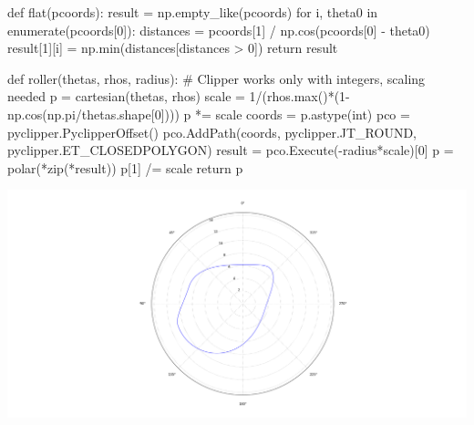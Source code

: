 \documentclass[a4paper,10pt,twoside]{article}
\begin{document}
    \begin{pycode}
    def flat(pcoords):
        result = np.empty_like(pcoords)
        for i, theta0 in enumerate(pcoords[0]):
            distances = pcoords[1] / np.cos(pcoords[0] - theta0)
            result[1][i] = np.min(distances[distances > 0])
        return result
    
    def roller(thetas, rhos, radius):
        # Clipper works only with integers, scaling needed
        p = cartesian(thetas, rhos)
        scale = 1/(rhos.max()*(1-np.cos(np.pi/thetas.shape[0])))
        p *= scale
        coords = p.astype(int)
        pco = pyclipper.PyclipperOffset()
        pco.AddPath(coords, pyclipper.JT_ROUND, pyclipper.ET_CLOSEDPOLYGON)
        result = pco.Execute(-radius*scale)[0]
        p = polar(*zip(*result))
        p[1] /= scale
        return p
    \end{pycode}

    \includegraphics[width=\textwidth]{cam.png}
\end{document}
